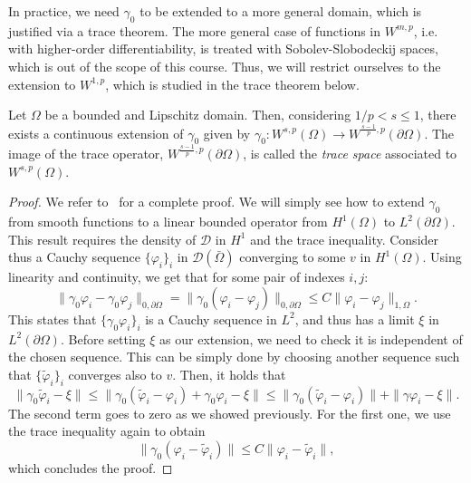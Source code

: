In practice, we need $\gamma_0$ to be extended to a more general domain, which is justified via a trace theorem. The more general case of functions in $W^{m,p}$, i.e. with higher-order differentiability, is treated with Sobolev-Slobodeckij spaces, which is out of the scope of this course. Thus, we will restrict ourselves to the extension to $W^{1,p}$, which is studied in the trace theorem below.
\begin{theorem}\label{thm:trace-theorem}
    Let $\Omega$ be a bounded and Lipschitz domain. Then, considering $1/p < s \leq 1$, there exists a continuous extension of $\gamma_0$ given by $\gamma_0: W^{s,p}(\Omega) \to W^{\frac{s-1}{p}, p}(\partial\Omega)$. The image of the trace operator, $W^{\frac{s-1}{p}, p}(\partial\Omega)$, is called the \emph{trace space} associated to $W^{s,p}(\Omega)$.
    \begin{proof}
        We refer to~\cite{adams2003sobolev} for a complete proof. We will simply see how to extend $\gamma_0$ from smooth functions to a linear bounded operator from $H^1(\Omega)$ to $L^2(\partial\Omega)$. This result requires the density of $\mathcal D$ in $H^1$ and the trace inequality. Consider thus a Cauchy sequence $\{\varphi_i\}_i$ in $\mathcal D(\bar\Omega)$ converging to some $v$ in $H^1(\Omega)$. Using linearity and continuity, we get that for some pair of indexes $i,j$: 
        \begin{equation*}
            \| \gamma_0 \varphi_i - \gamma_0 \varphi_j \|_{0,\partial\Omega} = \| \gamma_0 (\varphi_i - \varphi_j) \|_{0,\partial\Omega} \leq C \| \varphi_i - \varphi_j \|_{1,\Omega}.
        \end{equation*}
        This states that $\{ \gamma_0 \varphi_i \}_i $ is a Cauchy sequence in $L^2$, and thus has a limit $\xi$ in $L^2(\partial\Omega)$. Before setting $\xi$ as our extension, we need to check it is independent of the chosen sequence. This can be simply done by choosing another sequence such that $\{\tilde \varphi_i\}_i$ converges also to $v$. Then, it holds that 
        \begin{equation*}
            \| \gamma_0 \tilde \varphi_i - \xi \| \leq \| \gamma_0(\tilde\varphi_i - \varphi_i) + \gamma_0 \varphi_i - \xi \| \leq \| \gamma_0(\tilde\varphi_i - \varphi_i) \| + \| \gamma\varphi_i - \xi \|.
        \end{equation*}
        The second term goes to zero as we showed previously. For the first one, we use the trace inequality again to obtain 
        \begin{equation*}
            \| \gamma_0(\varphi_i - \tilde\varphi_i) \| \leq C \|\varphi_i - \tilde \varphi_i \|,
        \end{equation*}
        which concludes the proof. 
    \end{proof}
\end{theorem}

